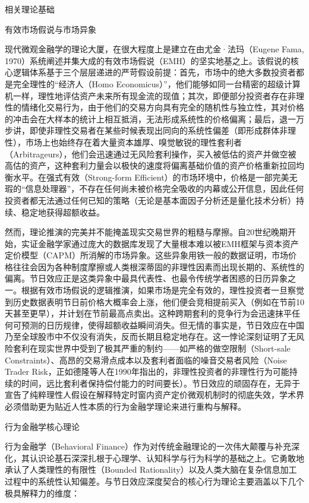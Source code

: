 \documentclass{cupb-thesis}
\begin{document}
相关理论基础

有效市场假说与市场异象

现代微观金融学的理论大厦，在很大程度上是建立在由尤金·法玛（Eugene Fama, 1970）系统阐述并集大成的有效市场假说（EMH）的坚实地基之上。该假说的核心逻辑体系基于三个层层递进的严苛假设前提：首先，市场中的绝大多数投资者都是完全理性的“经济人（Homo Economicus）”，他们能够如同一台精密的超级计算机一样，理性地评估资产未来所有现金流的现值；其次，即便部分投资者存在非理性的情绪化交易行为，由于他们的交易方向具有完全的随机性与独立性，其对价格的冲击会在大样本的统计上相互抵消，无法形成系统性的价格偏离；最后，退一万步讲，即使非理性交易者在某些时候表现出同向的系统性偏差（即形成群体非理性），市场上也始终存在着大量资本雄厚、嗅觉敏锐的理性套利者（Arbitrageurs），他们会迅速通过无风险套利操作，买入被低估的资产并做空被高估的资产，这种套利力量会以极快的速度将偏离基础价值的资产价格重新拉回均衡水平。在强式有效（Strong-form Efficient）的市场环境中，价格是一部完美无瑕的“信息处理器”，不存在任何尚未被价格完全吸收的内幕或公开信息，因此任何投资者都无法通过任何已知的策略（无论是基本面因子分析还是量化技术分析）持续、稳定地获得超额收益。


然而，理论推演的完美并不能掩盖现实交易世界的粗糙与摩擦。自20世纪晚期开始，实证金融学家通过庞大的数据库发现了大量根本难以被EMH框架与资本资产定价模型（CAPM）所消解的市场异象。这些异象用铁一般的数据证明，市场价格往往会因为各种制度摩擦或人类根深蒂固的非理性因素而出现长期的、系统性的偏离。节日效应正是这类异象中最具代表性、也最令传统学者困惑的日历异象之一。根据有效市场假说的逻辑推演，如果市场是完全有效的，理性投资者一旦察觉到历史数据表明节日前价格大概率会上涨，他们便会竞相提前买入（例如在节前10天甚至更早），并计划在节前最高点卖出。这种跨期套利的竞争行为会迅速抹平任何可预测的日历规律，使得超额收益瞬间消失。但无情的事实是，节日效应在中国乃至全球股市中不仅没有消失，反而长期且稳定地存在。这一悖论深刻证明了无风险套利在现实世界中受到了极其严重的制约——如严格的做空限制（Short-sale Constraints）、高昂的交易滑点成本以及套利者面临的噪音交易者风险（Noise Trader Risk，正如德隆等人在1990年指出的，非理性投资者的非理性行为可能持续的时间，远比套利者保持偿付能力的时间要长）。节日效应的顽固存在，无异于宣告了纯粹理性人假设在解释特定时窗内资产定价微观机制时的彻底失效，学术界必须借助更为贴近人性本质的行为金融学理论来进行重构与解释。


行为金融学核心理论

行为金融学（Behavioral Finance）作为对传统金融理论的一次伟大颠覆与补充深化，其认识论基石深深扎根于心理学、认知科学与行为科学的基础之上。它勇敢地承认了人类理性的有限性（Bounded Rationality）以及人类大脑在复杂信息加工过程中的系统性认知偏差。与节日效应深度契合的核心行为理论主要涵盖以下几个极具解释力的维度：
\end{document}
